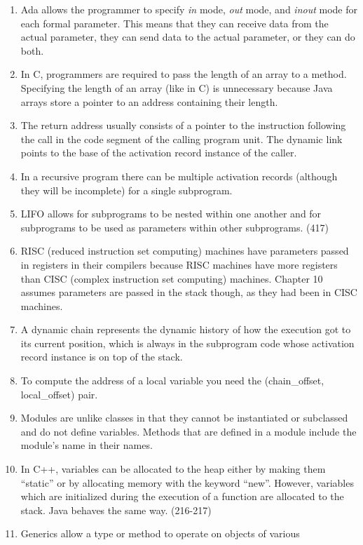 \begin{answer}
\begin{enumerate}
\item Ada allows the programmer to specify \textit{in} mode,
  \textit{out} mode, and \textit{inout} mode for each formal
  parameter.  This means that they can receive data from the actual
  parameter, they can send data to the actual parameter, or they can
  do both.
\item In C, programmers are required to pass the length of an array to
  a method. Specifying the length of an array (like in C) is
  unnecessary because Java arrays store a pointer to an address
  containing their length.
\item The return address usually consists of a pointer to the
  instruction following the call in the code segment of the calling
  program unit.  The dynamic link points to the base of the activation
  record instance of the caller.
\item In a recursive program there can be multiple activation records
  (although they will be incomplete) for a single subprogram.
\item LIFO allows for subprograms to be nested within one another and
  for subprograms to be used as parameters within other
  subprograms. (417)
\item RISC (reduced instruction set computing) machines have
  parameters passed in registers in their compilers because RISC
  machines have more registers than CISC (complex instruction set
  computing) machines. Chapter 10 assumes parameters are passed in the
  stack though, as they had been in CISC machines.
\item A dynamic chain represents the dynamic history of how the
  execution got to its current position, which is always in the
  subprogram code whose activation record instance is on top of the
  stack.
\item To compute the address of a local variable you need the
  (chain\_offset, local\_offset) pair.
\item Modules are unlike classes in that they cannot be instantiated
  or subclassed and do not define variables. Methods that are defined
  in a module include the module’s name in their names.
\item In C++, variables can be allocated to the heap either by making
  them “static” or by allocating memory with the keyword
  “new”. However, variables which are initialized during the execution
  of a function are allocated to the stack. Java behaves the same
  way. (216-217)
\item Generics allow a type or method to operate on objects of various

\end{enumerate}
\end{answer}

